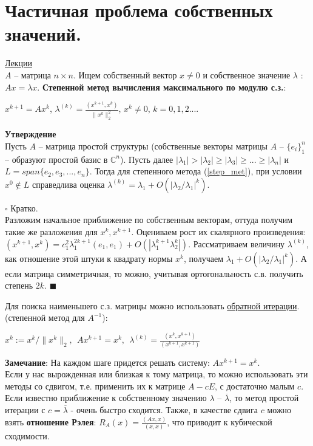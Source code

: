 \documentclass[specialist, subf, href, colorlinks=true, 12pt, times, mtpro, final]{disser}
\theoremstyle{definition}
\begin{document}
{\section {Частичная проблема собственных значений.}
    \hyperlink {lects.78}{Лекции}\\
    $A$ \--- матрица $n\times n$. Ищем собственный вектор $x \ne 0$ и собственное значение $\lambda$ : $Ax = \lambda x$.
    \textbf{Степенной метод вычисления максимального по модулю с.з.}:\\
    \begin{center}
    \label{step_met}
    $x^{k+1} = Ax^k$,  $\lambda^{(k)} = \frac{(x^{k+1}, x^k)}{\|x^k\|^2_2}$, $x^k \ne 0$,  $k=0,1,2...$.
    \end{center}
    \textbf{Утверждение}\\
    Пусть $A$ \--- матрица простой структуры (собственные векторы матрицы $A$ -- $\{e_i\}^n_1$ -- образуют простой базис в $\mathbb{C}^n$). Пусть далее $|\lambda_1| > |\lambda_2| \geq |\lambda_3| \geq ... \geq |\lambda_n|$ и $L=span\{e_2,e_3,...,e_n\}$. Тогда для степенного метода (\ref{step_met}), при условии $x^0 \notin L$ справедлива оценка $\lambda^{(k)} = \lambda_1 + O(|\lambda_2/\lambda_1|^k)$.
    
    \noindent$\square$ Кратко.\\
    Разложим начальное приближение по собственным векторам, оттуда получим такие же разложения для $x^k, x^{k+1}$. Оцениваем рост их скалярного произведения: $(x^{k+1}, x^k) = c^2_1 \lambda^{2k+1}_1 (e_1, e_1) + O(|\lambda^{k+1}_1\lambda^k_2|)$.
    Рассматриваем величину $\lambda^{(k)}$, как отношение этой штуки к квадрату нормы $x^k$,  получаем $\lambda_1 + O(|\lambda_2/\lambda_1|^k)$. А если матрица симметричная, то можно, учитывая ортогональность с.в. получить степень $2k$. 
    $\blacksquare$
    
    
    Для поиска наименьшего с.з. матрицы можно использовать \hyperlink{lects.79}{ обратной итерации}. (степенной метод для $A^{-1}$):
    \begin{center}
    $x^k := x^k / \|x^k\|_2,\ \  Ax^{k+1} = x^k,\ \  \lambda^{(k)} = \frac{(x^k, x^{k+1})}{(x^{k+1}, x^{k+1})}$
    \end{center}
    
    \noindent\textbf{Замечание}: На каждом шаге придется решать систему: $Ax^{k+1} = x^k$.
\\
Если у нас вырожденная или близкая к тому матрица, то можно использовать эти методы со сдвигом, т.е. применить их к матрице $A-cE$, с достаточно малым $c$.  Если известно приближение к собственному значению $\lambda$ \--- $\overline{\lambda}$, то метод простой итерации с $c = \overline{\lambda}$ - очень быстро сходится. Также, в качестве сдвига $c$ можно взять \textbf{отношение Рэлея}: $R_A(x) = \frac{(Ax, x)}{(x, x)}$, что приводит к кубической сходимости.
    
}
\end{document}
